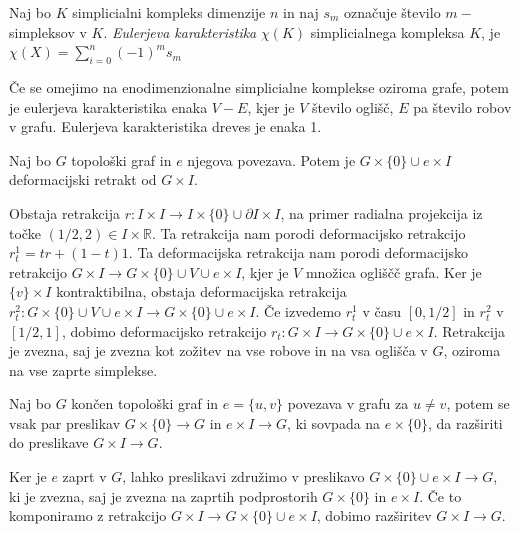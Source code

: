 \documentclass[mat1]{fmfdelo}
\newcommand{\R}{\mathbb R}
\begin{document}
\begin{definicija}
    Naj bo $K$ simplicialni kompleks dimenzije $n$ in naj $s_m$ označuje število $m-$simpleksov v $K$.
    \textit{Eulerjeva karakteristika} $\chi(K)$ simplicialnega kompleksa $K$, je  $\chi(X)=\sum\limits_{i=0}^n (-1)^m s_m$
\end{definicija}

Če se omejimo na enodimenzionalne simplicialne komplekse oziroma grafe, 
potem je eulerjeva karakteristika enaka $V-E$, kjer je $V$ število 
oglišč, $E$ pa 
število robov v grafu. Eulerjeva karakteristika dreves je enaka 1.

\begin{trditev}
    Naj bo $G$ topološki graf in $e$ njegova povezava. Potem je
    $G\times \{0\}\cup e\times I$ deformacijski retrakt od $G\times I$.
\end{trditev}

\begin{dokaz}
    Obstaja retrakcija $r: I\times I \rightarrow I\times \{0\} \cup \partial I \times I$, na primer radialna projekcija iz točke $(1/2,2)\in I\times \R$. Ta retrakcija nam porodi deformacijsko retrakcijo $r^1_t=tr+(1-t)1$. Ta deformacijska retrakcija nam porodi deformacijsko retrakcijo $G\times I \rightarrow G\times\{0\} \cup {V\cup e \times I}$, kjer je $V$ množica ogliščč grafa. Ker je $\{v\}\times I$ kontraktibilna, obstaja deformacijska retrakcija $r^2_t: G\times\{0\} \cup {V\cup e \times I}\rightarrow G\times\{0\} \cup { e \times I}$. Če izvedemo $r_t^1$ v času $[0,1/2]$ in $r^2_t$ v $[1/2,1]$, dobimo deformacijsko retrakcijo $r_t:G\times I \rightarrow G\times\{0\} \cup {e \times I}$. Retrakcija je zvezna, saj je zvezna kot zožitev na vse robove in na vsa oglišča v $G$, oziroma na vse zaprte simplekse.
\end{dokaz}

\begin{trditev}
    Naj bo $G$ končen topološki graf in  $e=\{u,v\}$ povezava v grafu za $u\neq v$, potem se vsak par preslikav $G\times \{0\}\rightarrow G$ in $e\times I \rightarrow G$, ki sovpada na $e\times \{0\}$, da razširiti do preslikave $G\times I \rightarrow G$.
\end{trditev}

\begin{dokaz}
    Ker je $e$ zaprt v $G$, lahko preslikavi združimo v preslikavo $G\times \{0\}\cup e\times I\rightarrow G$, ki je zvezna, saj je zvezna na zaprtih podprostorih $G\times \{0\}$ in $e\times I$. Če to komponiramo z retrakcijo $G\times I \rightarrow G\times \{0\}\cup e\times I$, dobimo razširitev $G\times I \rightarrow G.$
\end{dokaz}
\end{document}
